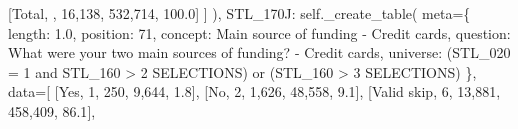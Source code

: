 \documentclass[
  11pt,
  a4paper,
]{article}
\newenvironment{Shaded}{\begin{snugshade}}{\end{snugshade}}
\newcommand{\NormalTok}[1]{\textcolor[rgb]{0.00,0.23,0.31}{#1}}
\newcommand{\OperatorTok}[1]{\textcolor[rgb]{0.37,0.37,0.37}{#1}}
\newcommand{\StringTok}[1]{\textcolor[rgb]{0.13,0.47,0.30}{#1}}
\newcommand{\VariableTok}[1]{\textcolor[rgb]{0.07,0.07,0.07}{#1}}
\begin{document}
\begin{Shaded}
\begin{Highlighting}[]
\NormalTok{                    [}\StringTok{\textquotesingle{}Total\textquotesingle{}}\NormalTok{, }\StringTok{\textquotesingle{}\textquotesingle{}}\NormalTok{, }\StringTok{\textquotesingle{}16,138\textquotesingle{}}\NormalTok{, }\StringTok{\textquotesingle{}532,714\textquotesingle{}}\NormalTok{, }\StringTok{\textquotesingle{}100.0\textquotesingle{}}\NormalTok{]}
\NormalTok{                ]}
\NormalTok{            ),}
            \StringTok{\textquotesingle{}STL\_170J\textquotesingle{}}\NormalTok{: }\VariableTok{self}\NormalTok{.\_create\_table(}
\NormalTok{                meta}\OperatorTok{=}\NormalTok{\{}
                    \StringTok{\textquotesingle{}length\textquotesingle{}}\NormalTok{: }\StringTok{\textquotesingle{}1.0\textquotesingle{}}\NormalTok{, }\StringTok{\textquotesingle{}position\textquotesingle{}}\NormalTok{: }\StringTok{\textquotesingle{}71\textquotesingle{}}\NormalTok{,}
                    \StringTok{\textquotesingle{}concept\textquotesingle{}}\NormalTok{: }\StringTok{\textquotesingle{}Main source of funding {-} Credit cards\textquotesingle{}}\NormalTok{,}
                    \StringTok{\textquotesingle{}question\textquotesingle{}}\NormalTok{: }\StringTok{\textquotesingle{}What were your two main sources of funding? {-} Credit cards\textquotesingle{}}\NormalTok{,}
                    \StringTok{\textquotesingle{}universe\textquotesingle{}}\NormalTok{: }\StringTok{\textquotesingle{}(STL\_020 = 1 and STL\_160 \textgreater{} 2 SELECTIONS) or (STL\_160 \textgreater{} 3 SELECTIONS)\textquotesingle{}}
\NormalTok{                \},}
\NormalTok{                data}\OperatorTok{=}\NormalTok{[}
\NormalTok{                    [}\StringTok{\textquotesingle{}Yes\textquotesingle{}}\NormalTok{, }\StringTok{\textquotesingle{}1\textquotesingle{}}\NormalTok{, }\StringTok{\textquotesingle{}250\textquotesingle{}}\NormalTok{, }\StringTok{\textquotesingle{}9,644\textquotesingle{}}\NormalTok{, }\StringTok{\textquotesingle{}1.8\textquotesingle{}}\NormalTok{],}
\NormalTok{                    [}\StringTok{\textquotesingle{}No\textquotesingle{}}\NormalTok{, }\StringTok{\textquotesingle{}2\textquotesingle{}}\NormalTok{, }\StringTok{\textquotesingle{}1,626\textquotesingle{}}\NormalTok{, }\StringTok{\textquotesingle{}48,558\textquotesingle{}}\NormalTok{, }\StringTok{\textquotesingle{}9.1\textquotesingle{}}\NormalTok{],}
\NormalTok{                    [}\StringTok{\textquotesingle{}Valid skip\textquotesingle{}}\NormalTok{, }\StringTok{\textquotesingle{}6\textquotesingle{}}\NormalTok{, }\StringTok{\textquotesingle{}13,881\textquotesingle{}}\NormalTok{, }\StringTok{\textquotesingle{}458,409\textquotesingle{}}\NormalTok{, }\StringTok{\textquotesingle{}86.1\textquotesingle{}}\NormalTok{],}

\end{Highlighting}
\end{Shaded}
\end{document}
